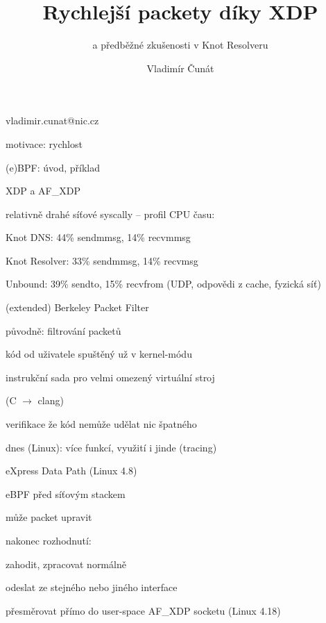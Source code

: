 
\czechenv

\pageAspectRatio[16:9]

\title{Rychlejší packety díky XDP}
\subtitle{a předběžné zkušenosti v Knot Resolveru}
\author{Vladimír Čunát}{vladimir.cunat@nic.cz}
\date[2019-10-01]


\slide[Přehled]

\bulletList
\item motivace: rychlost
\item (e)BPF: úvod, příklad
\item XDP a AF\_XDP
\endBulletList


\slide[Motivace]

relativně drahé síťové syscally -- profil CPU času:
\bulletList
\item Knot DNS: 44\% sendmmsg, 14\% recvmmsg
\item Knot Resolver: 33\% sendmmsg, 14\% recvmsg
\item Unbound: 39\% sendto, 15\% recvfrom
\endBulletList
(UDP, odpovědi z cache, fyzická síť)


\slide[(e)BPF]
(extended) Berkeley Packet Filter
\bulletList
\item původně: filtrování packetů
\item kód od uživatele spuštěný už v kernel-módu
\item instrukční sada pro velmi omezený virtuální stroj

(C $\to$ clang)
\item verifikace že kód nemůže udělat nic špatného
\item dnes (Linux): více funkcí, využití i jinde (tracing)
\endBulletList

\rightColumn
\bigskip
{}
\endColumn


\slide[XDP]

eXpress Data Path (Linux 4.8)
\bulletList
\item eBPF před síťovým stackem
\item může packet upravit
\endBulletList

nakonec rozhodnutí:
\bulletList
\item zahodit, zpracovat normálně
\item odeslat ze stejného nebo jiného interface
\item přesměrovat přímo do user-space AF\_XDP socketu (Linux 4.18)
\endBulletList




\bye

